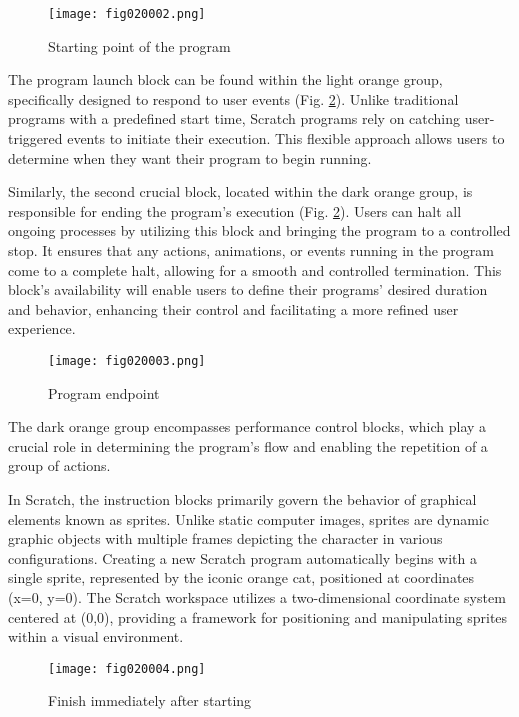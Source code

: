 \begin{figure}[H]
   \centering
   \texttt{[image: fig020002.png]}
   \caption{Starting point of the program}
\label{fig020002}
\end{figure}

The program launch block can be found within the light orange group, specifically designed to respond to user events (Fig. \ref{fig020003}). Unlike traditional programs with a predefined start time, Scratch programs rely on catching user-triggered events to initiate their execution. This flexible approach allows users to determine when they want their program to begin running.

Similarly, the second crucial block, located within the dark orange group, is responsible for ending the program's execution (Fig. \ref{fig020003}). Users can halt all ongoing processes by utilizing this block and bringing the program to a controlled stop. It ensures that any actions, animations, or events running in the program come to a complete halt, allowing for a smooth and controlled termination. This block's availability will enable users to define their programs' desired duration and behavior, enhancing their control and facilitating a more refined user experience.

\begin{figure}[H]
   \centering
   \texttt{[image: fig020003.png]}
   \caption{Program endpoint}
\label{fig020003}
\end{figure}

The dark orange group encompasses performance control blocks, which play a crucial role in determining the program's flow and enabling the repetition of a group of actions.

In Scratch, the instruction blocks primarily govern the behavior of graphical elements known as sprites. Unlike static computer images, sprites are dynamic graphic objects with multiple frames depicting the character in various configurations. Creating a new Scratch program automatically begins with a single sprite, represented by the iconic orange cat, positioned at coordinates (x=0, y=0). The Scratch workspace utilizes a two-dimensional coordinate system centered at (0,0), providing a framework for positioning and manipulating sprites within a visual environment.

\begin{figure}[H]
   \centering
   \texttt{[image: fig020004.png]}
   \caption{Finish immediately after starting}
\label{fig020004}
\end{figure}

